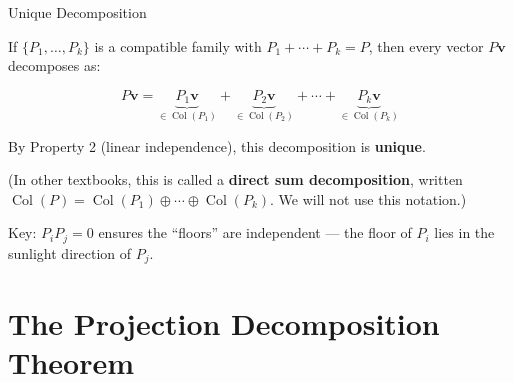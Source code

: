 \documentclass[10pt]{beamer}
\theoremstyle{definition}
\newcommand{\x}[1]{\alert{\textbf{#1}}}
\begin{document}
\begin{frame}{Unique Decomposition}

If $\{P_1, \ldots, P_k\}$ is a compatible family with $P_1 + \cdots + P_k = P$, then every vector $P\mathbf{v}$ decomposes as:

$$P\mathbf{v} = \underbrace{P_1\mathbf{v}}_{\in \operatorname{Col}(P_1)} + \underbrace{P_2\mathbf{v}}_{\in \operatorname{Col}(P_2)} + \cdots + \underbrace{P_k\mathbf{v}}_{\in \operatorname{Col}(P_k)}$$

\vspace{0.3em}

By Property 2 (linear independence), this decomposition is \x{unique}.

\vspace{0.5em}

{\small (In other textbooks, this is called a \textbf{direct sum decomposition}, written $\operatorname{Col}(P) = \operatorname{Col}(P_1) \oplus \cdots \oplus \operatorname{Col}(P_k)$. We will not use this notation.)}

\vspace{0.5em}

Key: $P_i P_j = 0$ ensures the ``floors'' are independent --- the floor of $P_i$ lies in the sunlight direction of $P_j$.

\end{frame}


\section{The Projection Decomposition Theorem}
\end{document}
